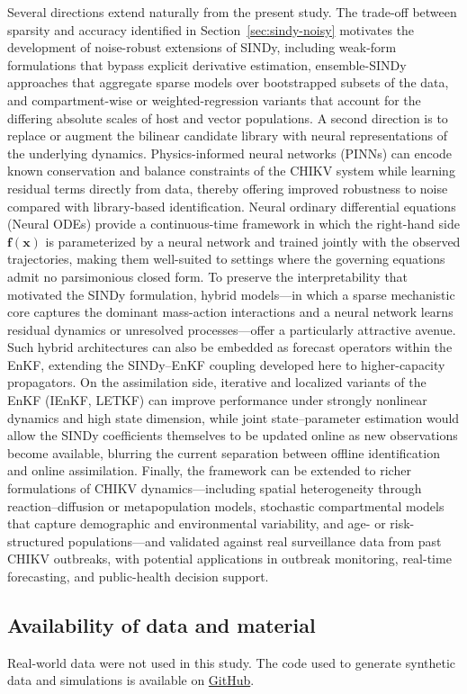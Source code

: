 \documentclass[9pt]{article}
\newcommand\bff{\mathbf{f}}
\newcommand\bfx{\mathbf{x}}
\numberwithin{equation}{section}
\begin{document}
Several directions extend naturally from the present study. The trade-off between sparsity and accuracy identified in Section~\ref{sec:sindy-noisy} motivates the development of noise-robust extensions of SINDy, including weak-form formulations that bypass explicit derivative estimation, ensemble-SINDy approaches that aggregate sparse models over bootstrapped subsets of the data, and compartment-wise or weighted-regression variants that account for the differing absolute scales of host and vector populations. A second direction is to replace or augment the bilinear candidate library with neural representations of the underlying dynamics. Physics-informed neural networks (PINNs) can encode known conservation and balance constraints of the CHIKV system while learning residual terms directly from data, thereby offering improved robustness to noise compared with library-based identification. Neural ordinary differential equations (Neural ODEs) provide a continuous-time framework in which the right-hand side $\bff(\bfx)$ is parameterized by a neural network and trained jointly with the observed trajectories, making them well-suited to settings where the governing equations admit no parsimonious closed form. To preserve the interpretability that motivated the SINDy formulation, hybrid models---in which a sparse mechanistic core captures the dominant mass-action interactions and a neural network learns residual dynamics or unresolved processes---offer a particularly attractive avenue. Such hybrid architectures can also be embedded as forecast operators within the EnKF, extending the SINDy--EnKF coupling developed here to higher-capacity propagators. On the assimilation side, iterative and localized variants of the EnKF (IEnKF, LETKF) can improve performance under strongly nonlinear dynamics and high state dimension, while joint state--parameter estimation would allow the SINDy coefficients themselves to be updated online as new observations become available, blurring the current separation between offline identification and online assimilation. Finally, the framework can be extended to richer formulations of CHIKV dynamics---including spatial heterogeneity through reaction--diffusion or metapopulation models, stochastic compartmental models that capture demographic and environmental variability, and age- or risk-structured populations---and validated against real surveillance data from past CHIKV outbreaks, with potential applications in outbreak monitoring, real-time forecasting, and public-health decision support.

\subsection*{Availability of data and material}
Real-world data were not used in this study. The code used to generate synthetic data and simulations is available on \href{https://github.com/Bernard0541/Hybrid-SINDy-EnKF-Chikungunya}{GitHub}.
\end{document}
